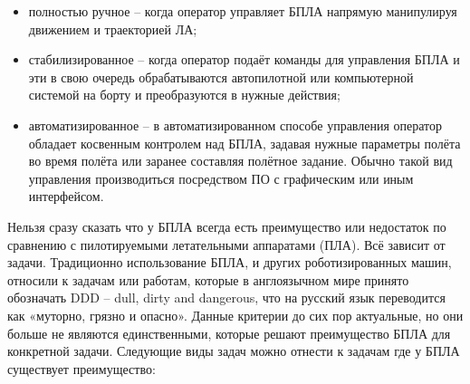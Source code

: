 \documentclass{itmo-student-thesis}
\begin{document}
\begin{itemize}
  \item полностью ручное -- когда оператор управляет БПЛА напрямую манипулируя
    движением и траекторией ЛА;
  \item стабилизированное -- когда оператор подаёт команды для управления БПЛА и
    эти в свою очередь обрабатываются автопилотной или компьютерной системой на
    борту и преобразуются в нужные действия;
  \item автоматизированное -- в автоматизированном способе управления оператор
    обладает косвенным контролем над БПЛА, задавая нужные параметры полёта во
    время полёта или заранее составляя полётное задание. Обычно такой вид
    управления производиться посредством ПО с графическим или иным интерфейсом.
\end{itemize}

Нельзя сразу сказать что у БПЛА всегда есть преимущество или недостаток по
сравнению с пилотируемыми летательными аппаратами (ПЛА). Всё зависит от задачи.
Традиционно использование БПЛА, и других роботизированных машин, относили к
задачам или работам, которые в англоязычном мире принято обозначать DDD -- dull,
dirty and dangerous, что на русский язык переводится как «муторно, грязно и
опасно». Данные критерии до сих пор актуальные, но они больше не являются
единственными, которые решают преимущество БПЛА для конкретной задачи. Следующие
виды задач можно отнести к задачам где у БПЛА существует преимущество:
\end{document}
